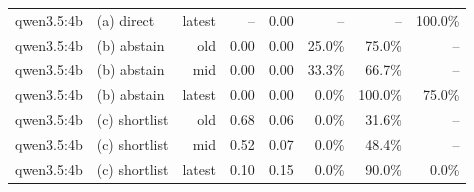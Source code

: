 \begin{table}[t]
\begin{tabular}{llrrrrrr}
qwen3.5:4b & (a) direct & latest & -- & 0.00 & -- & -- & 100.0\% \\
qwen3.5:4b & (b) abstain & old & 0.00 & 0.00 & 25.0\% & 75.0\% & -- \\
qwen3.5:4b & (b) abstain & mid & 0.00 & 0.00 & 33.3\% & 66.7\% & -- \\
qwen3.5:4b & (b) abstain & latest & 0.00 & 0.00 & 0.0\% & 100.0\% & 75.0\% \\
qwen3.5:4b & (c) shortlist & old & 0.68 & 0.06 & 0.0\% & 31.6\% & -- \\
qwen3.5:4b & (c) shortlist & mid & 0.52 & 0.07 & 0.0\% & 48.4\% & -- \\
qwen3.5:4b & (c) shortlist & latest & 0.10 & 0.15 & 0.0\% & 90.0\% & 0.0\% \\
\bottomrule
\end{tabular}
\end{table}
